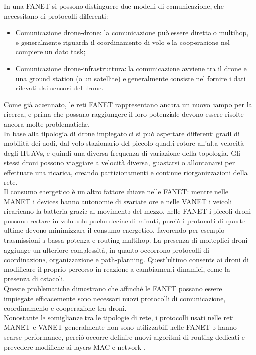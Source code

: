 In una FANET si possono distinguere due modelli di comunicazione, che necessitano di protocolli differenti:
\begin{itemize}
	\item Comunicazione drone-drone: la comunicazione può essere diretta o multihop, e generalmente riguarda il coordinamento di volo e la cooperazione nel compiere un dato task;
	\item Comunicazione drone-infrastruttura: la comunicazione avviene tra il drone e una ground station (o un satellite) e generalmente consiste nel fornire i dati rilevati dai sensori del drone.
\end{itemize}
Come già accennato, le reti FANET rappresentano ancora un nuovo campo per la ricerca, e prima che possano raggiungere il loro potenziale devono essere risolte ancora molte problematiche. \\
In base alla tipologia di drone impiegato ci si può aspettare differenti gradi di mobilità dei nodi, dal volo stazionario del piccolo quadri-rotore all'alta velocità degli HUAVs, e quindi una diversa frequenza di variazione della topologia. 
Gli stessi droni possono viaggiare a velocità diversa, guastarsi o allontanarsi per effettuare una ricarica, creando partizionamenti e continue riorganizzazioni della rete. \\
Il consumo energetico è un altro fattore chiave nelle FANET: mentre nelle MANET i devices hanno  autonomie di svariate ore e nelle VANET i veicoli ricaricano la batteria grazie al movimento del mezzo, nelle FANET i piccoli droni possono restare in volo solo poche decine di minuti, perciò i protocolli di queste ultime devono minimizzare il consumo energetico, favorendo per esempio trasmissioni a bassa potenza e routing multihop. 
La presenza di molteplici droni aggiunge un ulteriore complessità, in quanto occorrono protocolli di coordinazione, organizzazione e path-planning.
Quest'ultimo consente ai droni di modificare il proprio percorso in reazione a cambiamenti dinamici, come la presenza di ostacoli. \\
Queste problematiche dimostrano che affinché le FANET possano essere impiegate efficacemente sono necessari nuovi  protocolli di comunicazione, coordinamento e cooperazione tra droni. \\
Nonostante le somiglianze tra le tipologie di rete, i protocolli usati nelle reti MANET e VANET generalmente non sono utilizzabili nelle FANET o hanno scarse performance, perciò occorre definire nuovi algoritmi di routing dedicati e prevedere modifiche ai layers MAC e network \cite{7317490}.

